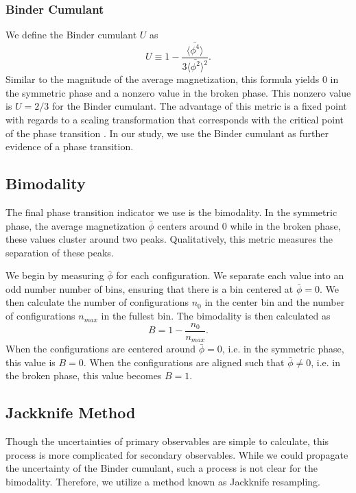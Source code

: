 \subsubsection{Binder Cumulant}
We define the Binder cumulant $U$ as \cite{binder1981}
\begin{equation}
    U \equiv 1-\frac{\langle \bar{\phi^4} \rangle}{3\langle \bar{\phi^2}\rangle^2}.
\end{equation}
Similar to the magnitude of the average magnetization, this formula yields $0$ in the symmetric phase and a nonzero value in the broken phase. This nonzero value is $U = 2/3$ for the Binder cumulant. The advantage of this metric is a fixed point with regards to a scaling transformation that corresponds with the critical point of the phase transition \cite{landau2000}. In our study, we use the Binder cumulant as further evidence of a phase transition.

\subsection{Bimodality}
The final phase transition indicator we use is the bimodality. In the symmetric phase, the average magnetization $\bar\phi$ centers around $0$ while in the broken phase, these values cluster around two peaks. Qualitatively, this metric measures the separation of these peaks.

We begin by measuring $\bar\phi$ for each configuration. We separate each value into an odd number number of bins, ensuring that there is a bin centered at $\bar\phi=0$. We then calculate the number of configurations $n_0$ in the center bin and the number of configurations $n_{max}$ in the fullest bin. The bimodality is then calculated as
\begin{equation}
    B = 1 - \frac{n_0}{n_{max}}.
\end{equation}
When the configurations are centered around $\bar\phi=0$, i.e. in the symmetric phase, this value is $B=0$. When the configurations are aligned such that $\bar\phi\neq0$, i.e. in the broken phase, this value becomes $B=1$.
\subsection{Jackknife Method}
Though the uncertainties of primary observables are simple to calculate, this process is more complicated for secondary observables. While we could propagate the uncertainty of the Binder cumulant, such a process is not clear for the bimodality. Therefore, we utilize a method known as Jackknife resampling. 

